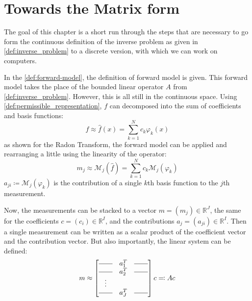 
\section{Towards the Matrix form}\label{sec:matrix_formulation}

The goal of this chapter is a short run through the steps that are necessary to go form the
continuous definition of the inverse problem as given in \autoref{def:inverse_problem} to a discrete
version, with which we can work on computers.

In the \autoref{def:forward-model}, the definition of forward model is given. This forward model
takes the place of the bounded linear operator \(A\) from \autoref{def:inverse_problem}. However,
this is all still in the continuous space. Using \autoref{def:permissible_representation}, \(f\) can
decomposed into the sum of coefficients and basis functions:
\[ f \approx \hat{f}(x) = \sum_{k=1}^{N} c_k \varphi_k(x) \]
as shown for the Radon Transform, the forward model can be applied and rearranging a little using
the linearity of the operator:
\[ m_j \approx \mathscr{M}_j(\hat{f}) = \sum_{k=1}^{N} c_k \mathscr{M}_j(\varphi_k) \]
\(a_{ji} \coloneq \mathscr{M}_j(\varphi_k)\) is the contribution of a single \(k\)th basis function
to the \(j\)th measurement.


Now, the measurements can be stacked to a vector \(m = (m_j) \in \mathbb{R}^J\), the same for
the coefficients \(c = (c_i) \in \mathbb{R}^I\), and the contributions \(a_{j} = (a_{ji}) \in
\mathbb{R}^I\). Then a single measurement can be written as a scalar product of the coefficient
vector and the contribution vector. But also importantly, the linear system can be defined:
\begin{equation}\label{eq:system_lin_equation}
	m \approx
	\begin{bmatrix}
		\rule[.5ex]{2em}{0.4pt} & a_1^T & \rule[.5ex]{2em}{0.4pt} \\
		\rule[.5ex]{2em}{0.4pt} & a_2^T & \rule[.5ex]{2em}{0.4pt} \\
		\vdots                                                    \\
		\rule[.5ex]{2em}{0.4pt} & a_J^T & \rule[.5ex]{2em}{0.4pt}
	\end{bmatrix} c \eqcolon A c
\end{equation}

